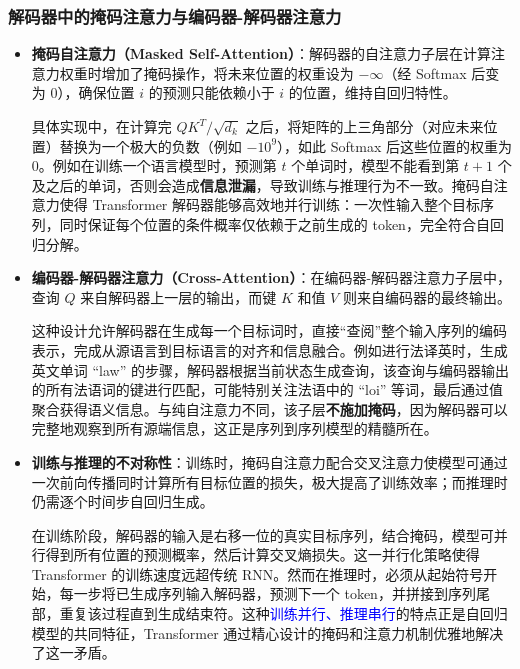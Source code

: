 \documentclass[11pt]{beamer}
\begin{document}
\begin{frame}
\frametitle{解码器中的掩码注意力与编码器-解码器注意力}
\begin{itemize}
  \item \textbf{掩码自注意力（Masked Self-Attention）}：解码器的自注意力子层在计算注意力权重时增加了掩码操作，将未来位置的权重设为 $-\infty$（经 Softmax 后变为 0），确保位置 $i$ 的预测只能依赖小于 $i$ 的位置，维持自回归特性。\par
  具体实现中，在计算完 $QK^T/\sqrt{d_k}$ 之后，将矩阵的上三角部分（对应未来位置）替换为一个极大的负数（例如 $-10^9$），如此 Softmax 后这些位置的权重为 $0$。例如在训练一个语言模型时，预测第 $t$ 个单词时，模型不能看到第 $t+1$ 个及之后的单词，否则会造成\textbf{信息泄漏}，导致训练与推理行为不一致。掩码自注意力使得 Transformer 解码器能够高效地并行训练：一次性输入整个目标序列，同时保证每个位置的条件概率仅依赖于之前生成的 token，完全符合自回归分解。

  \item \textbf{编码器-解码器注意力（Cross-Attention）}：在编码器-解码器注意力子层中，查询 $Q$ 来自解码器上一层的输出，而键 $K$ 和值 $V$ 则来自编码器的最终输出。\par
  这种设计允许解码器在生成每一个目标词时，直接“查阅”整个输入序列的编码表示，完成从源语言到目标语言的对齐和信息融合。例如进行法译英时，生成英文单词 “law” 的步骤，解码器根据当前状态生成查询，该查询与编码器输出的所有法语词的键进行匹配，可能特别关注法语中的 “loi” 等词，最后通过值聚合获得语义信息。与纯自注意力不同，该子层\textbf{不施加掩码}，因为解码器可以完整地观察到所有源端信息，这正是序列到序列模型的精髓所在。

  \item \textbf{训练与推理的不对称性}：训练时，掩码自注意力配合交叉注意力使模型可通过一次前向传播同时计算所有目标位置的损失，极大提高了训练效率；而推理时仍需逐个时间步自回归生成。\par
  在训练阶段，解码器的输入是右移一位的真实目标序列，结合掩码，模型可并行得到所有位置的预测概率，然后计算交叉熵损失。这一并行化策略使得 Transformer 的训练速度远超传统 RNN。然而在推理时，必须从起始符号开始，每一步将已生成序列输入解码器，预测下一个 token，并拼接到序列尾部，重复该过程直到生成结束符。这种\textcolor{blue}{训练并行、推理串行}的特点正是自回归模型的共同特征，Transformer 通过精心设计的掩码和注意力机制优雅地解决了这一矛盾。
\end{itemize}
\end{frame}
\end{document}
